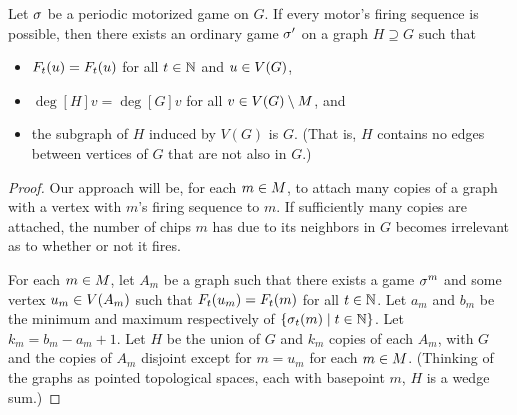 \begin{thm} \label{natMotors}
Let $\s$ be a periodic motorized game on $G$. If every motor's firing sequence
is possible, then there exists an ordinary game $\s'$ on a graph $H \supseteq
G$ such that
\begin{itemize}
\item $\firing[\s']{u}{t} = \firing{u}{t}$ for all $t \in \nats$ and $u \in
  \V$,
\item $\deg[H]{v} = \deg[G]{v}$ for all $v \in \V \setminus \mots$, and
\item the subgraph of $H$ induced by $V(G)$ is $G$. (That is, $H$ contains no
  edges between vertices of $G$ that are not also in $G$.)
\end{itemize}
\end{thm}

\begin{proof}
Our approach will be, for each $m \in \mots$, to attach many copies of a graph
with a vertex with $m$'s firing sequence to $m$. If sufficiently many copies
are attached, the number of chips $m$ has due to its neighbors in $G$ becomes
irrelevant as to whether or not it fires.

For each $m \in \mots$, let $A_m$ be a graph such that there exists a game
$\s^m$ and some vertex $u _m\in \V[A_m]$ such that $\firing[\s^m]{u_m}{t} =
\firing{m}{t}$ for all $t \in \nats$. Let $a_m$ and $b_m$ be the minimum and
maximum respectively of $\set{\chips{m}{t}}{t \in \nats}$. Let $k_m = b_m - a_m
+ 1$. Let $H$ be the union of $G$ and $k_m$ copies of each $A_m$, with $G$ and
the copies of $A_m$ disjoint except for $m = u_m$ for each $m \in
\mots$. (Thinking of the graphs as pointed topological spaces, each with
basepoint $m$, $H$ is a wedge sum.)


\end{proof}
